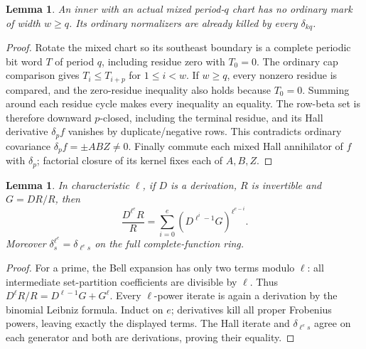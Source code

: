 \documentclass[11pt,a4paper]{amsart}
\numberwithin{equation}{section}
\theoremstyle{plain}
\newtheorem{lemma}[theorem]{Lemma}
\theoremstyle{definition}
\begin{document}
\begin{lemma}\label{lem:mixed-width}
An inner with an actual mixed period-\(q\) chart has no ordinary mark of width \(w\ge q\).  Its ordinary normalizers are already killed by every \(\delta_{kq}\).
\end{lemma}
\begin{proof}
Rotate the mixed chart so its southeast boundary is a complete periodic bit word \(T\) of period \(q\), including residue zero with \(T_0=0\).  The ordinary cap comparison gives \(T_i\le T_{i+p}\) for \(1\le i<w\).  If \(w\ge q\), every nonzero residue is compared, and the zero-residue inequality also holds because \(T_0=0\).  Summing around each residue cycle makes every inequality an equality.  The row-beta set is therefore downward \(p\)-closed, including the terminal residue, and its Hall derivative \(\delta_pf\) vanishes by duplicate/negative rows.  This contradicts ordinary covariance \(\delta_pf=\pm ABZ\ne0\).  Finally commute each mixed Hall annihilator of \(f\) with \(\delta_p\); factorial closure of its kernel fixes each of \(A,B,Z\).
\end{proof}

\begin{lemma}\label{lem:bell}
In characteristic \(\ell\), if \(D\) is a derivation, \(R\) is invertible and \(G=DR/R\), then
\[
 \frac{D^{\ell^e}R}{R}=
 \sum_{i=0}^e\left(D^{\ell^i-1}G\right)^{\ell^{e-i}}.
\]
Moreover \(\delta_s^{\ell^e}=\delta_{\ell^es}\) on the full complete-function ring.
\end{lemma}
\begin{proof}
For a prime, the Bell expansion has only two terms modulo \(\ell\): all intermediate set-partition coefficients are divisible by \(\ell\).  Thus \(D^\ell R/R=D^{\ell-1}G+G^\ell\).  Every \(\ell\)-power iterate is again a derivation by the binomial Leibniz formula.  Induct on \(e\); derivatives kill all proper Frobenius powers, leaving exactly the displayed terms.  The Hall iterate and \(\delta_{\ell^es}\) agree on each generator and both are derivations, proving their equality.
\end{proof}
\end{document}

